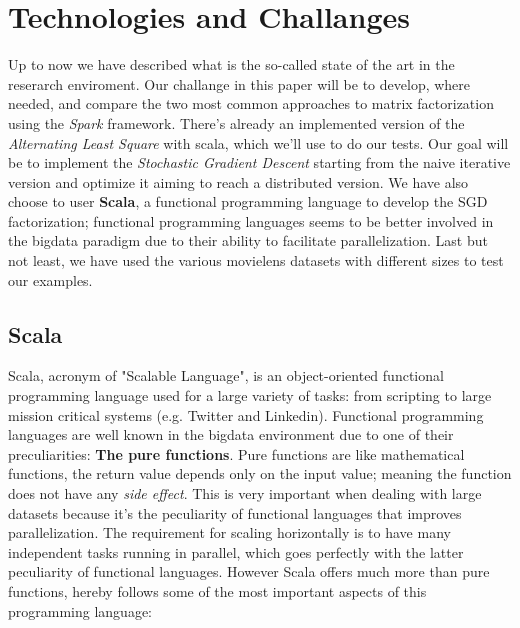 \documentclass{sig-alternate-05-2015}
\begin{document}
\section{Technologies and Challanges}

Up to now we have described what is the so-called
state of the art in the reserarch enviroment.
Our challange in this paper will be to develop, where needed,
and compare the two most common approaches to matrix factorization using
the \textit{Spark} framework. There's already an implemented version
of the \textit{Alternating Least Square} with scala, which we'll use
to do our tests. Our goal will be to implement the \textit{Stochastic Gradient Descent}
starting from the naive iterative version and optimize it aiming to reach
a distributed version.
We have also choose to user \textbf{Scala}, a functional programming language
to develop the SGD factorization; functional programming languages seems
to be better involved in the bigdata paradigm due to their ability
to facilitate parallelization.
Last but not least, we have used the various movielens datasets with different sizes
to test our examples.

\subsection{Scala}
Scala, acronym of "Scalable Language", is an object-oriented functional programming
language used for a large variety of tasks: from scripting to large mission
critical systems (e.g. Twitter and Linkedin).
Functional programming languages are well known in the bigdata environment
due to one of their preculiarities: \textbf{The pure functions}.
Pure functions are like mathematical functions, the return value depends only
on the input value; meaning the function does not have any \textit{side effect}.
This is very important when dealing with large datasets because it's the peculiarity
of functional languages that improves parallelization. The requirement
for scaling horizontally is to have many independent tasks running in parallel,
which goes perfectly with the latter peculiarity of functional languages.
However Scala offers much more than pure functions, hereby follows some of
the most important aspects of this programming language:\\
\end{document}
